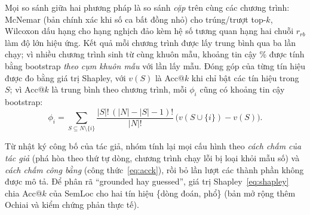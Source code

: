 \label{sec:thong-ke}%
Mọi so sánh giữa hai phương pháp là so sánh \emph{cặp} trên cùng các chương trình: McNemar (bản chính xác khi số ca
bất đồng nhỏ) cho trúng/trượt top-$k$, Wilcoxon dấu hạng cho hạng nghịch đảo kèm hệ số tương quan hạng hai chuỗi
$r_{rb}$ làm độ lớn hiệu ứng. Kết quả mỗi chương trình được lấy trung bình qua ba lần chạy; vì nhiều chương trình
sinh từ cùng khuôn mẫu, khoảng tin cậy \ConstCiLevel\% được tính bằng bootstrap \emph{theo cụm khuôn mẫu} với
\ConstBootstrapDraws{} lần lấy mẫu. Đóng góp của từng tín hiệu được đo bằng giá trị Shapley, với $v(S)$ là Acc@$k$ khi
chỉ bật các tín hiệu trong $S$; vì Acc@$k$ là trung bình theo chương trình, mỗi $\phi_i$ cũng có khoảng tin cậy bootstrap:
\begin{equation} \phi_i = \sum_{S \subseteq N\setminus\{i\}} \frac{|S|!\,(|N|-|S|-1)!}{|N|!}\,\bigl(v(S\cup\{i\}) - v(S)\bigr). \label{eq:shapley} \end{equation}

Từ nhật ký công bố của tác giả, nhóm tính lại mọi cấu hình theo \emph{cách chấm của tác giả} (phá hòa theo thứ tự dòng,
chương trình chạy lỗi bị loại khỏi mẫu số) và \emph{cách chấm công bằng} (công thức~\eqref{eq:acck}), rồi bỏ lần lượt
các thành phần không được mô tả. Để phân rã ``grounded hay guessed'', giá trị Shapley~\eqref{eq:shapley} chia Acc@$k$
của SemLoc cho hai tín hiệu \{dòng đoán, phổ\} (bản mở rộng thêm Ochiai và kiểm chứng phản thực tế).
